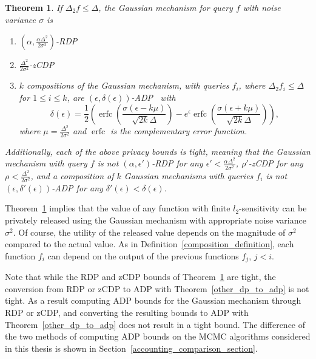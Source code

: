\documentclass[english,twoside,openright]{HYgraduMLDS}
\newtheorem{theorem}{Theorem}
\DeclareMathOperator{\erfc}{erfc}
\begin{document}
\begin{theorem}\label{gauss-DP-bounds}
  If \(\Delta_{2}f \leq \Delta\), the Gaussian mechanism for query \(f\) with
  noise variance \(\sigma\) is
    \begin{enumerate}
        \item 
            \((\alpha, \frac{\alpha \Delta^2}{2\sigma^2})\)-RDP~\cite{Mironov17}
        \item 
            \(\frac{\Delta^2}{2\sigma^2}\)-zCDP~\cite{BuS16}
        \item 
            \(k\) compositions of the Gaussian mechanism, with
            queries \(f_{i}\), where \(\Delta_{2}f_{i}\leq \Delta\) for
            \(1\leq i \leq k\), are
            \((\epsilon, \delta(\epsilon))\)-ADP~\cite{Sommer2019} with 
            \[
                \delta(\epsilon) 
                = \frac{1}{2}\left(
                    \erfc\left(\frac{\sigma(\epsilon - k\mu)}{\sqrt{2k}\Delta}\right)
                    - e^\epsilon \erfc\left(\frac{\sigma(\epsilon + k\mu)}{\sqrt{2k}\Delta}\right)
                \right),
            \]
            where \(\mu = \frac{\Delta^2}{2\sigma^2}\) and \(\erfc\) is 
            the complementary error function.
    \end{enumerate}
    Additionally, each of the above privacy bounds is tight, meaning that
    the Gaussian mechanism with query \(f\) is not \((\alpha, \epsilon')\)-RDP
    for any \(\epsilon' < \frac{\alpha\Delta^{2}}{2\sigma^{2}}\), \(\rho'\)-zCDP
    for any \(\rho < \frac{\Delta^{2}}{2\sigma^{2}}\), and a composition
    of \(k\) Gaussian mechanisms with queries \(f_{i}\) is not
    \((\epsilon, \delta'(\epsilon))\)-ADP for any
    \(\delta'(\epsilon) < \delta(\epsilon)\).
\end{theorem}

Theorem~\ref{gauss-DP-bounds} implies that the value of any function with
finite \(l_2\)-sensitivity can be privately released using the Gaussian mechanism
with appropriate noise variance \(\sigma^2\). Of course, the utility of the
released value depends on the magnitude of \(\sigma^2\) compared to the actual
value. As in Definition~\ref{composition_definition}, each function \(f_{i}\)
can depend on the output of the previous functions \(f_{j}\), \(j < i\).

Note that while the RDP and zCDP bounds of Theorem~\ref{gauss-DP-bounds} are
tight, the conversion from RDP or zCDP to ADP with Theorem~\ref{other_dp_to_adp}
is not tight. As a result computing
ADP bounds for the Gaussian mechanism through RDP or zCDP, and converting
the resulting bounds to ADP with Theorem~\ref{other_dp_to_adp} does not
result in a tight bound. The difference of the two methods of computing ADP bounds
on the MCMC algorithms considered in this thesis is shown in
Section~\ref{accounting_comparison_section}.
\end{document}

